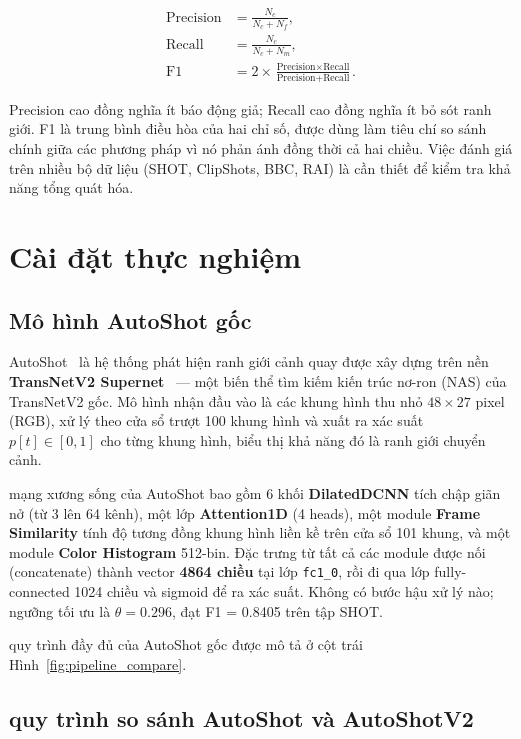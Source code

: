 \begin{align}
    \text{Precision} &= \frac{N_c}{N_c + N_f}, \\
    \text{Recall} &= \frac{N_c}{N_c + N_m}, \\
    \text{F1} &= 2 \times \frac{\text{Precision} \times \text{Recall}}{\text{Precision} + \text{Recall}}.
\end{align}

Precision cao đồng nghĩa ít báo động giả; Recall cao đồng nghĩa ít bỏ sót ranh giới. F1 là trung bình điều hòa của hai chỉ số, được dùng làm tiêu chí so sánh chính giữa các phương pháp vì nó phản ánh đồng thời cả hai chiều. Việc đánh giá trên nhiều bộ dữ liệu (SHOT, ClipShots, BBC, RAI) là cần thiết để kiểm tra khả năng tổng quát hóa.

\section{Cài đặt thực nghiệm}


\subsection{Mô hình AutoShot gốc}

AutoShot~\cite{zhu2023autoshot} là hệ thống phát hiện ranh giới cảnh quay được xây dựng trên nền \textbf{TransNetV2 Supernet}~\cite{soucek2020transnetv2} --- một biến thể tìm kiếm kiến trúc nơ-ron (NAS) của TransNetV2 gốc. Mô hình nhận đầu vào là các khung hình thu nhỏ $48 \times 27$ pixel (RGB), xử lý theo cửa sổ trượt 100 khung hình và xuất ra xác suất $p[t] \in [0,1]$ cho từng khung hình, biểu thị khả năng đó là ranh giới chuyển cảnh.

mạng xương sống của AutoShot bao gồm 6 khối \textbf{DilatedDCNN} tích chập giãn nở (từ 3 lên 64 kênh), một lớp \textbf{Attention1D} (4 heads), một module \textbf{Frame Similarity} tính độ tương đồng khung hình liền kề trên cửa sổ 101 khung, và một module \textbf{Color Histogram} 512-bin. Đặc trưng từ tất cả các module được nối (concatenate) thành vector \textbf{4864 chiều} tại lớp \texttt{fc1\_0}, rồi đi qua lớp fully-connected 1024 chiều và sigmoid để ra xác suất. Không có bước hậu xử lý nào; ngưỡng tối ưu là $\theta = 0.296$, đạt F1 = 0.8405 trên tập SHOT.

quy trình đầy đủ của AutoShot gốc được mô tả ở cột trái Hình~\ref{fig:pipeline_compare}.

\subsection{quy trình so sánh AutoShot và AutoShotV2}

